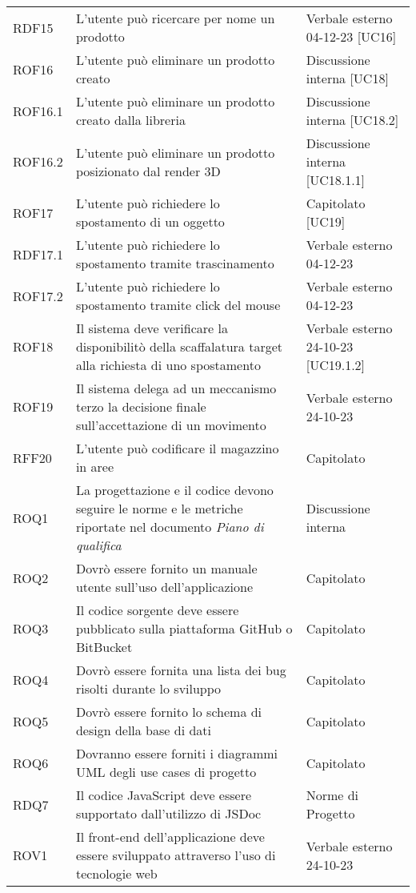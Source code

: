 \begin{xltabular}{\textwidth}{ p{0.2\textwidth} | X | p{0.2\textwidth} }
    RDF15& L'utente può ricercare per nome un prodotto & Verbale esterno 04-12-23 [UC16]\\
    ROF16& L'utente può eliminare un prodotto creato & Discussione interna [UC18]\\
    ROF16.1& L'utente può eliminare un prodotto creato dalla libreria & Discussione interna [UC18.2]\\
    ROF16.2& L'utente può eliminare un prodotto posizionato dal render 3D & Discussione interna [UC18.1.1]\\
    ROF17& L'utente può richiedere lo spostamento di un oggetto & Capitolato [UC19]\\
    RDF17.1& L'utente può richiedere lo spostamento tramite trascinamento & Verbale esterno 04-12-23\\
    ROF17.2& L'utente può richiedere lo spostamento tramite click del mouse & Verbale esterno 04-12-23\\
    ROF18& Il sistema deve verificare la disponibilitò della scaffalatura target alla richiesta di uno spostamento & Verbale esterno 24-10-23 [UC19.1.2]\\
    ROF19& Il sistema delega ad un meccanismo terzo la decisione finale sull'accettazione di un movimento & Verbale esterno 24-10-23\\
    RFF20& L'utente può codificare il magazzino in aree & Capitolato \\
    ROQ1& La progettazione e il codice devono seguire le norme e le metriche riportate nel documento \textit{Piano di qualifica} & Discussione interna \\
    ROQ2& Dovrò essere fornito un manuale utente sull'uso dell'applicazione & Capitolato \\
    ROQ3& Il codice sorgente deve essere pubblicato sulla piattaforma GitHub o BitBucket & Capitolato \\
    ROQ4& Dovrò essere fornita una lista dei bug risolti durante lo sviluppo & Capitolato  \\
    ROQ5& Dovrò essere fornito lo schema di design della base di dati & Capitolato  \\
    ROQ6& Dovranno essere forniti i diagrammi UML degli use cases di progetto & Capitolato  \\
    RDQ7& Il codice JavaScript deve essere supportato dall'utilizzo di JSDoc & Norme di Progetto \\
    ROV1& Il front-end dell'applicazione deve essere sviluppato attraverso l'uso di tecnologie web & Verbale esterno 24-10-23 \\

\end{xltabular}
